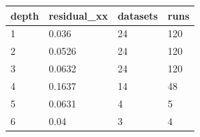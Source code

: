 \begin{tabular}{llll}
\toprule
depth & residual\_xx & datasets & runs \\
\midrule
1 & 0.036 & 24 & 120 \\
2 & 0.0526 & 24 & 120 \\
3 & 0.0632 & 24 & 120 \\
4 & 0.1637 & 14 & 48 \\
5 & 0.0631 & 4 & 5 \\
6 & 0.04 & 3 & 4 \\
\bottomrule
\end{tabular}

